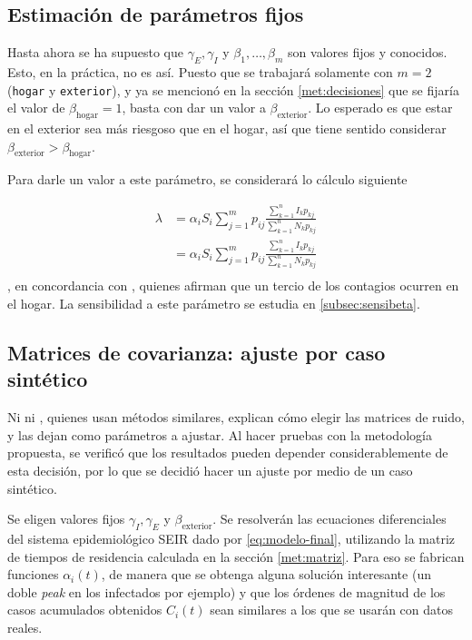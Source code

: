 \subsection{Estimación de parámetros fijos}
Hasta ahora se ha supuesto que \(\gamma_E, \gamma_I\) y \(\beta_1, \dots, \beta_m\) son valores fijos y conocidos. Esto, en la práctica, no es así. Puesto que se trabajará solamente con \(m= 2\) (\texttt{hogar} y \texttt{exterior}), y ya se mencionó en la sección \ref{met:decisiones} que se fijaría el valor de \(\beta_{\text{hogar}} = 1\), basta con dar un valor a \(\beta_{\text{exterior}}\). Lo esperado es que estar en el exterior sea más riesgoso que en el hogar, así que tiene sentido considerar \(\beta_{\text{exterior}} > \beta_{\text{hogar}}\). 

Para darle un valor a este parámetro, se considerará lo cálculo siguiente


\[
\begin{aligned}
\lambda &= \alpha_i S_i \sum_{j = 1}^m p_{ij} \frac{\sum_{k = 1}^n I_{k} p_{kj}}{\sum_{k = 1}^n N_{k} p_{kj}} \\
&= \alpha_i S_i \sum_{j = 1}^m p_{ij} \frac{\sum_{k = 1}^n I_{k} p_{kj}}{\sum_{k = 1}^n N_{k} p_{kj}} \\
\end{aligned}
\]
, en concordancia con \cite{Ferguson2020}\cite{}, quienes afirman que un tercio de los contagios ocurren en el hogar. La sensibilidad a este parámetro se estudia en \ref{subsec:sensibeta}.


\subsection{Matrices de covarianza: ajuste por caso sintético}

Ni \cite{Hasan2020} ni \cite{Sameni2020}, quienes usan métodos similares, explican cómo elegir las matrices de ruido, y las dejan como parámetros a ajustar. Al hacer pruebas con la metodología propuesta, se verificó que los resultados pueden depender considerablemente de esta decisión, por lo que se decidió hacer un ajuste por medio de un caso sintético.


Se eligen valores fijos \(\gamma_I, \gamma_E\) y \(\beta_{\text{exterior}}\). Se resolverán las ecuaciones diferenciales del sistema epidemiológico SEIR dado por \ref{eq:modelo-final}, utilizando la matriz de tiempos de residencia calculada en la sección \ref{met:matriz}. Para eso se fabrican funciones \(\alpha_i(t)\), de manera que se obtenga alguna solución interesante (un doble \textit{peak} en los infectados por ejemplo) y que los órdenes de magnitud de los casos acumulados obtenidos \(C_i(t)\) sean similares a los que se usarán con datos reales.

